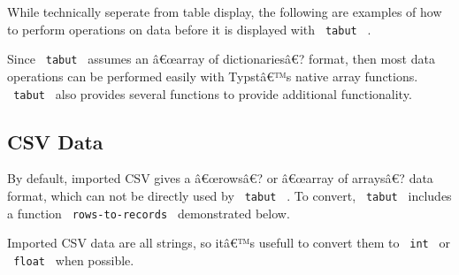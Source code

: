 \pandocbounded{}

While technically seperate from table display, the following are
examples of how to perform operations on data before it is displayed
with \texttt{\ tabut\ } .

Since \texttt{\ tabut\ } assumes an â€œarray of dictionariesâ€? format,
then most data operations can be performed easily with Typstâ€™s native
array functions. \texttt{\ tabut\ } also provides several functions to
provide additional functionality.

\subsection[CSV Data ]{\texorpdfstring{CSV Data
\protect\hypertarget{csv-data}{}{ }}{CSV Data  }}\label{csv-data}

By default, imported CSV gives a â€œrowsâ€? or â€œarray of arraysâ€?
data format, which can not be directly used by \texttt{\ tabut\ } . To
convert, \texttt{\ tabut\ } includes a function
\texttt{\ rows-to-records\ } demonstrated below.

\begin{Shaded}
\begin{Highlighting}[]

\NormalTok{  )}
\NormalTok{\}}
\end{Highlighting}
\end{Shaded}

Imported CSV data are all strings, so itâ€™s usefull to convert them to
\texttt{\ int\ } or \texttt{\ float\ } when possible.

